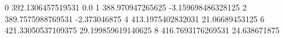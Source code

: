 0 392.1306457519531 0.0
1 388.970947265625 -3.159698486328125
2 389.7575988769531 -2.373046875
4 413.1975402832031 21.06689453125
6 421.33050537109375 29.199859619140625
8 416.7693176269531 24.638671875
